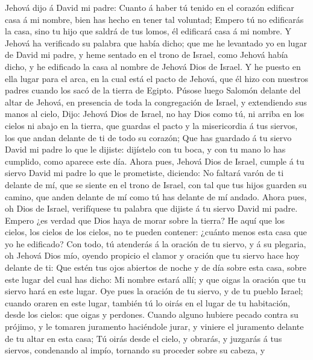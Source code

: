 Jehová dijo á David mi padre: Cuanto á haber tú tenido en el corazón
edificar casa á mi nombre, bien has hecho en tener tal voluntad;
 Empero tú no edificarás la casa, sino tu hijo que saldrá
de tus lomos, él edificará casa á mi nombre.  Y Jehová ha
verificado su palabra que había dicho; que me he levantado yo en lugar
de David mi padre, y heme sentado en el trono de Israel, como Jehová
había dicho, y he edificado la casa al nombre de Jehová Dios de Israel.
 Y he puesto en ella lugar para el arca, en la cual está el
pacto de Jehová, que él hizo con nuestros padres cuando los sacó de la
tierra de Egipto.  Púsose luego Salomón delante del altar
de Jehová, en presencia de toda la congregación de Israel, y extendiendo
sus manos al cielo,  Dijo: Jehová Dios de Israel, no hay
Dios como tú, ni arriba en los cielos ni abajo en la tierra, que guardas
el pacto y la misericordia á tus siervos, los que andan delante de ti de
todo su corazón;  Que has guardado á tu siervo David mi
padre lo que le dijiste: dijístelo con tu boca, y con tu mano lo has
cumplido, como aparece este día.  Ahora pues, Jehová Dios
de Israel, cumple á tu siervo David mi padre lo que le prometiste,
diciendo: No faltará varón de ti delante de mí, que se siente en el
trono de Israel, con tal que tus hijos guarden su camino, que anden
delante de mí como tú has delante de mí andado.  Ahora
pues, oh Dios de Israel, verifíquese tu palabra que dijiste á tu siervo
David mi padre.  Empero ¿es verdad que Dios haya de morar
sobre la tierra? He aquí que los cielos, los cielos de los cielos, no te
pueden contener: ¿cuánto menos esta casa que yo he edificado?
 Con todo, tú atenderás á la oración de tu siervo, y á su
plegaria, oh Jehová Dios mío, oyendo propicio el clamor y oración que tu
siervo hace hoy delante de ti:  Que estén tus ojos abiertos
de noche y de día sobre esta casa, sobre este lugar del cual has dicho:
Mi nombre estará allí; y que oigas la oración que tu siervo hará en este
lugar.  Oye pues la oración de tu siervo, y de tu pueblo
Israel; cuando oraren en este lugar, también tú lo oirás en el lugar de
tu habitación, desde los cielos: que oigas y perdones. 
Cuando alguno hubiere pecado contra su prójimo, y le tomaren juramento
haciéndole jurar, y viniere el juramento delante de tu altar en esta
casa;  Tú oirás desde el cielo, y obrarás, y juzgarás á tus
siervos, condenando al impío, tornando su proceder sobre su cabeza, y
